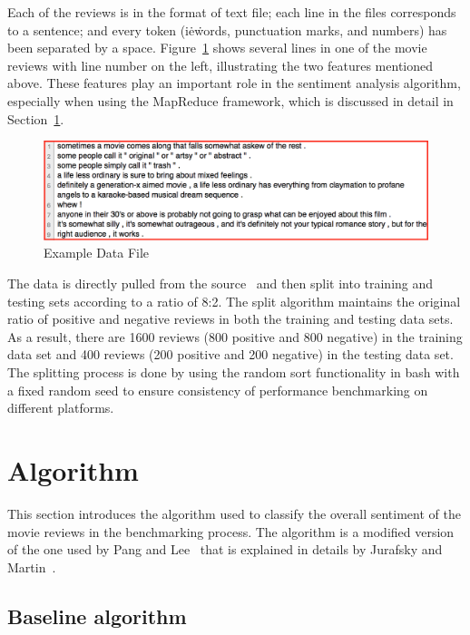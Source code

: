 Each of the reviews is in the format of text file; each line in the
files corresponds to a sentence; and every token (i\.e\. words,
punctuation marks, and numbers) has been separated by a
space. Figure~\ref{f:data} shows several lines in one of the movie
reviews with line number on the left, illustrating the two features
mentioned above. These features play an important role in the
sentiment analysis algorithm, especially when using the MapReduce
framework, which is discussed in detail in Section~\ref{s:algorithm}.
\begin{figure}[!ht]
	\centering\includegraphics[width=\columnwidth]{images/polarity-data.png}
	\caption{Example Data File}\label{f:data}
\end{figure}

The data is directly pulled from the
source~\cite{hid-sp18-405-sentiment-data} and then split into training
and testing sets according to a ratio of 8:2. The split algorithm
maintains the original ratio of positive and negative reviews in both
the training and testing data sets. As a result, there are 1600
reviews (800 positive and 800 negative) in the training data set and
400 reviews (200 positive and 200 negative) in the testing data
set. The splitting process is done by using the random sort
functionality in bash with a fixed random seed to ensure consistency
of performance benchmarking on different platforms.


\section{Algorithm}\label{s:algorithm}

This section introduces the algorithm used to classify the overall
sentiment of the movie reviews in the benchmarking process. The
algorithm is a modified version of the one used by Pang and
Lee~\cite{hid-sp18-405-sentiment-pang2004asentimental} that is
explained in details by Jurafsky and
Martin~\cite{hid-sp18-405-sentiment-jurafsky2009}.

\subsection{Baseline algorithm}\label{ss:base}

